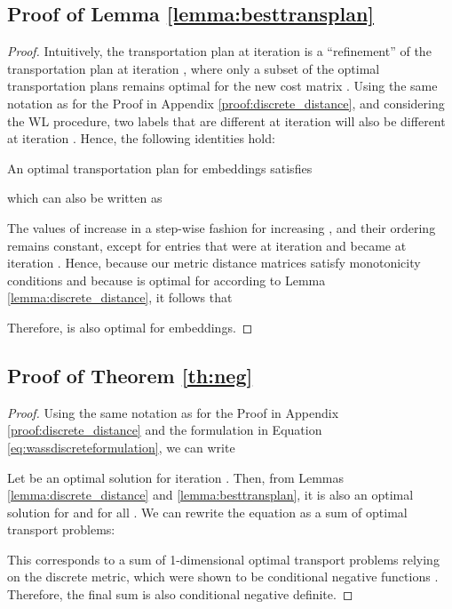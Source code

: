\documentclass{article}
\begin{document}
\subsection{Proof of Lemma \ref{lemma:besttransplan}}
\label{proof:besttransplan}
\begin{proof}
Intuitively, the transportation plan at iteration  is a ``refinement'' of the transportation plan at iteration , where only a subset of the optimal transportation plans remains optimal for the new cost matrix .
Using the same notation as for the Proof in Appendix \ref{proof:discrete_distance},
and considering the WL procedure, two labels that are different at iteration  will also be different at iteration . Hence, the following identities hold:




An optimal transportation plan  for  embeddings satisfies

which can also be written as

The values of  increase in a step-wise fashion for increasing , and their ordering remains constant, except for entries that were  at iteration  and became  at iteration . Hence, because our metric distance matrices satisfy monotonicity conditions and because  is optimal for  according to Lemma \ref{lemma:discrete_distance}, it follows that

Therefore,  is also optimal for  embeddings.
\end{proof}

\subsection{Proof of Theorem \ref{th:neg}}
\label{proof:theorem}
\begin{proof}
Using the same notation as for the Proof in Appendix \ref{proof:discrete_distance} and the formulation in Equation \ref{eq:wassdiscreteformulation}, we can write


Let  be an optimal solution for iteration . Then, from Lemmas \ref{lemma:discrete_distance} and \ref{lemma:besttransplan}, it is also an optimal solution for  and for all . We can rewrite the equation as a sum of optimal transport problems:

This corresponds to a sum of 1-dimensional optimal transport problems relying on the discrete metric, which were shown to be conditional negative functions \citep{gardner2017definiteness}. Therefore, the final sum is also conditional negative definite.
\end{proof} 
\end{document}
